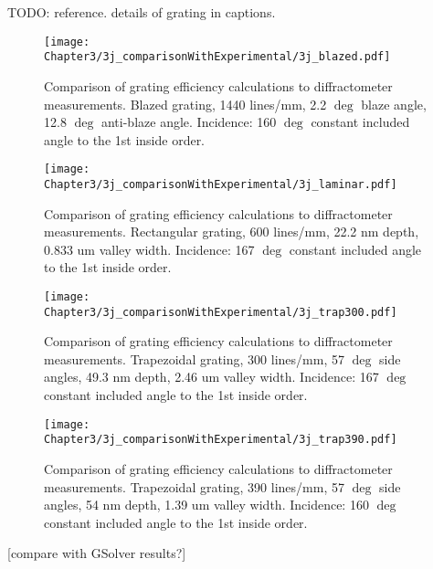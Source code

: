  TODO: reference. details of grating in captions.
 
\begin{figure}[htbp] %
   \centering
   \texttt{[image: Chapter3/3j\_comparisonWithExperimental/3j\_blazed.pdf]} 
   \caption{Comparison of grating efficiency calculations to diffractometer measurements.  Blazed grating, 1440 lines/mm, 2.2 $\deg$ blaze angle, 12.8 $\deg$ anti-blaze angle. Incidence: 160 $\deg$ constant included angle to the 1st inside order.}
   \label{3j-1}
\end{figure}

\begin{figure}[htbp] %
   \centering
   \texttt{[image: Chapter3/3j\_comparisonWithExperimental/3j\_laminar.pdf]} 
   \caption{Comparison of grating efficiency calculations to diffractometer measurements.  Rectangular grating, 600 lines/mm, 22.2 nm depth, 0.833 um valley width.  Incidence: 167 $\deg$ constant included angle to the 1st inside order.}
   \label{3j-2}
\end{figure}

\begin{figure}[htbp] %
   \centering
   \texttt{[image: Chapter3/3j\_comparisonWithExperimental/3j\_trap300.pdf]} 
   \caption{Comparison of grating efficiency calculations to diffractometer measurements.  Trapezoidal grating, 300 lines/mm, 57 $\deg$ side angles, 49.3 nm depth, 2.46 um valley width.  Incidence: 167 $\deg$ constant included angle to the 1st inside order.}
   \label{3j-3}
\end{figure}

\begin{figure}[htbp] %
   \centering
   \texttt{[image: Chapter3/3j\_comparisonWithExperimental/3j\_trap390.pdf]} 
   \caption{Comparison of grating efficiency calculations to diffractometer measurements.  Trapezoidal grating, 390 lines/mm, 57 $\deg$ side angles, 54 nm depth, 1.39 um valley width.  Incidence: 160 $\deg$ constant included angle to the 1st inside order.}
   \label{3j-4}
\end{figure}

 [compare with GSolver results?]
